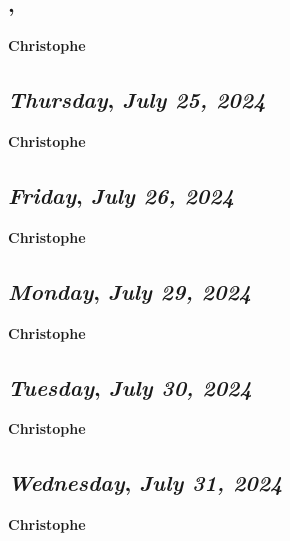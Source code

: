 \subsection*{\weekday, \day}
\textbf {Christophe}

\def\day{\textit{July 25, 2024}}
\def\weekday{\textit{Thursday}}
\subsection*{\weekday, \day}
\textbf {Christophe}

\def\day{\textit{July 26, 2024}}
\def\weekday{\textit{Friday}}
\subsection*{\weekday, \day}
\textbf {Christophe}



\def\day{\textit{July 29, 2024}}
\def\weekday{\textit{Monday}}
\subsection*{\weekday, \day}
\textbf {Christophe}

\def\day{\textit{July 30, 2024}}
\def\weekday{\textit{Tuesday}}
\subsection*{\weekday, \day}
\textbf {Christophe}

\def\day{\textit{July 31, 2024}}
\def\weekday{\textit{Wednesday}}
\subsection*{\weekday, \day}
\textbf {Christophe}
